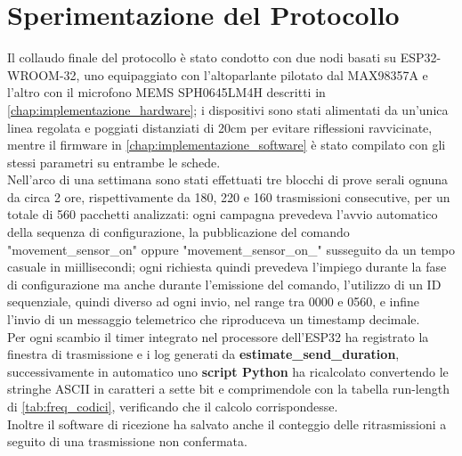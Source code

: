 \chapter{Sperimentazione del Protocollo}
\label{chap:sperimentazione}

Il collaudo finale del protocollo è stato condotto con due nodi basati su ESP32-WROOM-32, uno equipaggiato con 
l'altoparlante pilotato dal MAX98357A e l'altro con il microfono MEMS SPH0645LM4H descritti in \autoref{chap:implementazione_hardware}; 
i dispositivi sono stati alimentati da un'unica linea regolata e poggiati distanziati di 20cm per evitare 
riflessioni ravvicinate, mentre il firmware in \autoref{chap:implementazione_software} è
 stato compilato con gli stessi parametri su entrambe le schede.\\
  Nell'arco di una settimana sono stati effettuati tre blocchi di prove serali ognuna da circa 2 ore, 
 rispettivamente da 180, 220 e 160 trasmissioni consecutive, per un totale di 560 pacchetti analizzati: ogni campagna prevedeva l'avvio automatico 
 della sequenza di configurazione, la pubblicazione del comando "movement\_sensor\_on" oppure "movement\_sensor\_on\_" susseguito da un tempo casuale in miillisecondi; 
 ogni richiesta quindi prevedeva l'impiego durante la fase di configurazione ma anche durante l'emissione del comando, l'utilizzo di un ID sequenziale, 
 quindi diverso ad ogni invio, nel range tra 0000 e 0560, e infine
 l'invio di un messaggio telemetrico che riproduceva un timestamp decimale.\\
  Per ogni scambio il timer integrato nel processore dell'ESP32 ha registrato la finestra di trasmissione e i log generati
  da \textbf{estimate\_send\_duration}, successivamente in automatico uno \textbf{script Python} ha ricalcolato convertendo le stringhe ASCII
   in caratteri a sette bit e comprimendole con la tabella run-length di \autoref{tab:freq_codici}, verificando che il calcolo corrispondesse.\\
   Inoltre il software di ricezione ha salvato anche il conteggio delle ritrasmissioni a seguito di una trasmissione non confermata.


